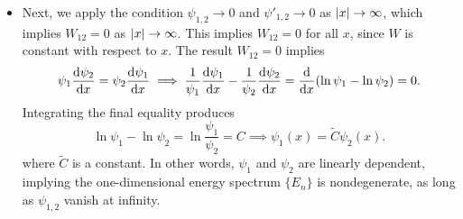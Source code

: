 \documentclass[11pt, a4paper]{article}
\renewcommand{\t}[1]{\tilde{#1}}
\newcommand{\p}{\psi}  %
\begin{document}
\begin{itemize}
	\item Next, we apply the condition $ \p_{1, 2} \to 0 $ and $ \p'_{1, 2} \to 0 $ as $ \abs{x} \to \infty $, which implies $ W_{12} = 0 $ as $ \abs{x} \to \infty  $. This implies $ W_{12} = 0 $ for all $ x $, since $ W $ is constant with respect to $ x $. The result $ W_{12} = 0 $ implies
	\begin{equation*}
		\p_{1}\dv{\p_{2}}{x} = \p_{2}\dv{\p_{1}}{x} \implies \frac{1}{\p_{1}} \dv{\p_{1}}{x} - \frac{1}{\p_{2}} \dv{\p_{2}}{x} = \dv{x}(\ln \p_{1} - \ln \p_{2}) = 0.
	\end{equation*}
	Integrating the final equality produces
	\begin{equation*}
		\ln \p_{1} - \ln \p_{2} = \ln \frac{\p_{1}}{\p_{2}} = C \implies \p_{1}(x) = \t{C} \p_{2}(x).
	\end{equation*}
	where $ \t{C} $ is a constant. In other words, $ \p_{1} $ and $ \p_{2} $ are linearly dependent, implying the one-dimensional energy spectrum $ \{E_{n}\} $ is nondegenerate, as long as $ \p_{1,2} $ vanish at infinity.
\end{itemize}
\end{document}
